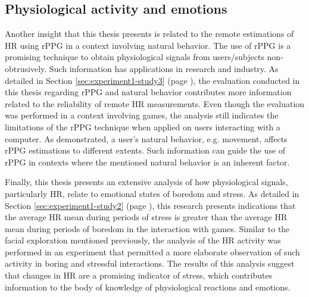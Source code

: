 \subsection{Physiological activity and emotions}

Another insight that this thesis presents is related to the remote estimations of HR using rPPG in a context involving natural behavior. The use of rPPG is a promising technique to obtain physiological signals from users/subjects non-obtrusively. Such information has applications in research and industry. As detailed in Section \ref{sec:experiment1-study3} (page \pageref{sec:experiment1-study3}), the evaluation conducted in this thesis regarding rPPG and natural behavior contributes more information related to the reliability of remote HR measurements. Even though the evaluation was performed in a context involving games, the analysis still indicates the limitations of the rPPG technique when applied on users interacting with a computer. As demonstrated, a user's natural behavior, e.g. movement, affects rPPG estimations to different extents. Such information can guide the use of rPPG in contexts where the mentioned natural behavior is an inherent factor.

Finally, this thesis presents an extensive analysis of how physiological signals, particularly HR, relate to emotional states of boredom and stress. As detailed in Section \ref{sec:experiment1-study2} (page \pageref{sec:experiment1-study2}), this research presents indications that the average HR mean during periods of stress is greater than the average HR mean during periods of boredom in the interaction with games. Similar to the facial exploration mentioned previously, the analysis of the HR activity was performed in an experiment that permitted a more elaborate observation of such activity in boring and stressful interactions. The results of this analysis suggest that changes in HR are a promising indicator of stress, which contributes information to the body of knowledge of physiological reactions and emotions.



